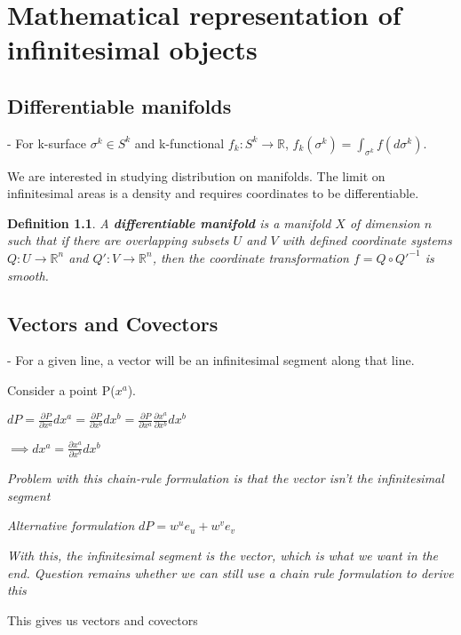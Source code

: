 \documentclass{book}
\newtheorem{defn}[equation]{Definition}
\begin{document}
\chapter{Mathematical representation of infinitesimal objects}


\section{Differentiable manifolds}


- For k-surface $\sigma^k \in S^k$ and k-functional $f_k: S^k \to \mathbb{R}$, $f_k(\sigma^k) = \int_{\sigma^k}f(d\sigma^k)$. 

We are interested in studying distribution on manifolds. The limit on infinitesimal areas is a density and requires coordinates to be differentiable.


\begin{defn}
	A \textbf{differentiable manifold} is a manifold $X$ of dimension $n$ such that if there are overlapping subsets $U$ and $V$ with defined coordinate systems $Q: U \to \mathbb{R}^n$ and $Q': V \to \mathbb{R}^n$, then the coordinate transformation $f = Q \circ Q'^{-1}$ is smooth. 
\end{defn}





\section{Vectors and Covectors}

- For a given line, a vector will be an infinitesimal segment along that line. 


Consider a point P($x^a$).
 
$dP = \frac{\partial P}{\partial x^a} dx^a = \frac{\partial P}{\partial x^b} dx^b = \frac{\partial P}{\partial x^a}\frac{\partial x^a}{\partial x^b} dx^b$

$\implies dx^a = \frac{\partial x^a}{\partial x^b}dx^b $

\emph{Problem with this chain-rule formulation is that the vector isn't the infinitesimal segment}

\emph{Alternative formulation}
$dP = w^ue_u + w^ve_v$

\emph{With this, the infinitesimal segment is the vector, which is what we want in the end. Question remains whether we can still use a chain rule formulation to derive this}

This gives us vectors and covectors
\end{document}
